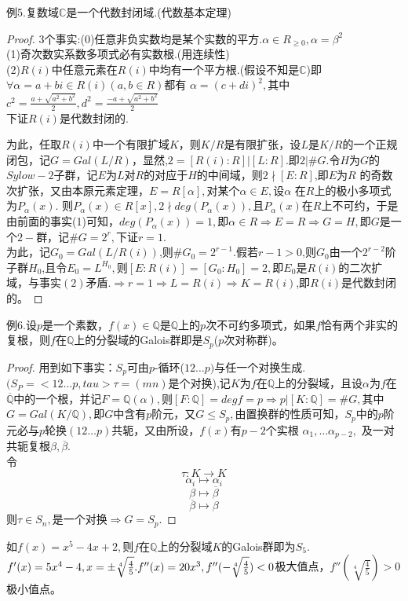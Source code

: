 \documentclass[UTF8]{article}
\begin{document}
例5.复数域$\mathbb{C}$是一个代数封闭域.(代数基本定理)
\begin{proof}
	3个事实:(0)任意非负实数均是某个实数的平方.$\alpha\in R_{\geqslant0},\alpha=\beta^2$\\
	(1)奇次数实系数多项式必有实数根.(用连续性)\\
	(2)$R(i)$中任意元素在$R(i)$中均有一个平方根.(假设不知是$\mathbb{C}$)即$\forall \alpha=a+bi\in R(i)(a,b\in R)$都有
	$\alpha=(c+di)^2,$其中$c^2=\frac{a+\sqrt{a^2+b^2}}{2},d^2=\frac{-a+\sqrt{a^2+b^2}}{2}$\\
	下证$R(i)$是代数封闭的.
	
	
	为此，任取$R(i)$中一个有限扩域$K$，则$K/R$是有限扩张，设$L$是$K/R$的一个正规闭包，记$G=Gal(L/R)$，显然,$2=[R(i):R]|[L:R]$.即$2|\#G.$令$H$为$G$的$Sylow-2$子群，记$E$为$L$对$R$的对应于$H$的中间域，则$2\nmid[E:R]$,即$E$为$R$ 的奇数次扩张，又由本原元素定理，$E=R[\alpha],$对某个$\alpha\in E,$设$\alpha$ 在$R$上的极小多项式为$P_{\alpha}(x).$ 则$P_{\alpha}(x)\in R[x],2\nmid deg(P_{\alpha}(x)),$且$P_{\alpha}(x)$在$R$上不可约，于是由前面的事实(1)可知，$deg(P_{\alpha}(x))=1,$即$\alpha\in R\Rightarrow E=R\Rightarrow G=H,$即$G$是一个$2- $群，记$\#G=2^r,$下证$r=1$.\\
	为此，记$G_0=Gal(L/R(i))$,则$\#G_0=2^{r-1}$.假若$r-1>0$,则$G_0$由一个$2^{r-2}$阶子群$H_0$,且令$E_0=L^{H_0},$则$[E:R(i)]=[G_0:H_0]=2,$即$E_0$是$R(i)$的二次扩域，与事实$(2)$矛盾.$\Rightarrow r=1\Rightarrow L=R(i)\Rightarrow K=R(i)$,即$R(i)$是代数封闭的。
\end{proof}
例6.设$p$是一个素数，$f(x)\in \mathbb{Q}$是$\mathbb{Q}$上的$p$次不可约多项式，如果$f$恰有两个非实的复根，则$f$在$\mathbb{Q}$上的分裂域的Galois群即是$S_p$($p$次对称群)。
\begin{proof}
	用到如下事实：$S_p$可由$p$-循环($12\ldots p)$与任一个对换生成.$(S_P=<12\ldots p,tau>\tau=(mn)$是个对换),记$K$为$f$在$\mathbb{Q}$上的分裂域，且设$\alpha$为$f$在$\overline{\mathbb{Q}}$中的一个根，并记$F=\mathbb{Q}(\alpha),$则$[F:\mathbb{Q}]=degf=p\Rightarrow p|[K:\mathbb{Q}]=\#G,$其中$G=Gal(K/\mathbb{Q}),$即$G$中含有$p$阶元，又$G\leqslant S_p,$由置换群的性质可知，$S_p$中的$p$阶元必与$p$轮换$(12\ldots p)$共轭，又由所设，$f(x)$有$p-2$个实根
	$\alpha_1,\ldots\alpha_{p-2},$ 及一对共轭复根$\beta,\overline{\beta}.$\\
	令
	$$\tau:K\longrightarrow K$$
	$$
	\alpha_i\longmapsto \alpha_i$$
	$$
	\beta\longmapsto\overline{\beta}$$
	$$
	\overline{\beta}\longmapsto\beta$$
	则$\tau\in S_n,$是一个对换$\Rightarrow G=S_p$.
\end{proof}
如$f(x)=x^5-4x+2,$则$f$在$\mathbb{Q}$上的分裂域$K$的Galois群即为$S_5$.\\
$f'(x)=5x^4-4,x=\pm\sqrt[4]{\frac{4}{5}}.\\
f''(x)=20x^3,f''(-\sqrt[4]{\frac{4}{5}})<0$极大值点，$f''(\sqrt[4]{\frac{4}{5}})>0$极小值点。



 
\end{document}

